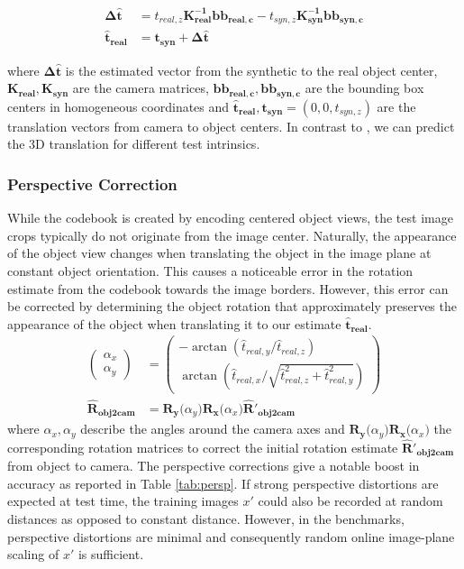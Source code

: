 \begin{align}
\boldsymbol{\Delta \hat{t}} &= \hat{t}_{real,z} \boldsymbol{K_{real}^{-1}} \boldsymbol{bb_{real,c}} - t_{syn,z}\boldsymbol{ K_{syn}^{-1}} \boldsymbol{bb_{syn,c}}
\\[+0.5em]
\boldsymbol{\hat{t}_{real}} &= \boldsymbol{t_{syn}} + \boldsymbol{\Delta \hat{t}}
\end{align}

where $\boldsymbol{\Delta \hat{t}}$ is the estimated vector from the synthetic to the real object center, $\boldsymbol{K_{real}}, \boldsymbol{K_{syn}}$ are the camera matrices, $\boldsymbol{bb_{real,c}},\boldsymbol{bb_{syn,c}}$ are the bounding box centers in homogeneous coordinates and $\boldsymbol{\hat{t}_{real}}, \boldsymbol{t_{syn}} = (0,0,t_{syn,z})$ are the translation vectors from camera to object centers. In contrast to \cite{kehl2017ssd}, we can predict the 3D translation for different test intrinsics.

\subsubsection{Perspective Correction}
While the codebook is created by encoding centered object views, the test image crops typically do not originate from the image center. Naturally, the appearance of the object view changes when translating the object in the image plane at constant object orientation. This causes a noticeable error in the rotation estimate from the codebook towards the image borders. However, this error can be corrected by determining the object rotation that approximately preserves the appearance of the object when translating it to our estimate $\boldsymbol{\hat{t}_{real}}$.
\begin{align}
\label{eq:correct}
\left( \begin{array}{c}\alpha_x\\\alpha_y \end{array} \right) 
 &= 
 \left( \begin{array}{c} -\arctan(\hat{t}_{real,y} / \hat{t}_{real,z})  \\ \arctan(\hat{t}_{real,x} / \sqrt{\hat{t}_{real,z}^2 + \hat{t}^2_{real,y}}) \end{array} \right)\\[+1em]
 \boldsymbol{\hat{R}_{obj2cam}} &= \boldsymbol{ R_y(}\alpha_y\boldsymbol{)R_x(}\alpha_x\boldsymbol{)\hat{R}'_{obj2cam}}
\end{align}
where $\alpha_x, \alpha_y$ describe the angles around the camera axes and $\boldsymbol{ R_y(}\alpha_y\boldsymbol{)R_x(}\alpha_x\boldsymbol{)}$ the corresponding rotation matrices to correct the initial rotation estimate $\boldsymbol{\hat{R}'_{obj2cam}}$ from object to camera.
The perspective corrections give a notable boost in accuracy as reported in Table \ref{tab:persp}. If strong perspective distortions are expected at test time, the training images $x'$ could also be recorded at random distances as opposed to constant distance. However, in the benchmarks, perspective distortions are minimal and consequently random online image-plane scaling of $x'$ is sufficient. 

